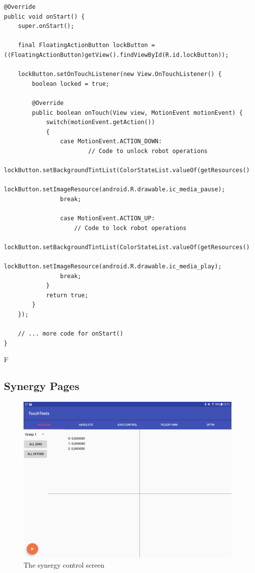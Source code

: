 \begin{lstlisting}[caption={Code for the interlock button}, label=lst:impl:interlock]
@Override
public void onStart() {
	super.onStart();
	
	final FloatingActionButton lockButton = ((FloatingActionButton)getView().findViewById(R.id.lockButton));

	lockButton.setOnTouchListener(new View.OnTouchListener() {
		boolean locked = true;
		
		@Override
		public boolean onTouch(View view, MotionEvent motionEvent) {
			switch(motionEvent.getAction())
			{
				case MotionEvent.ACTION_DOWN:
                        // Code to unlock robot operations
						lockButton.setBackgroundTintList(ColorStateList.valueOf(getResources().getColor(R.color.posOk)));
						lockButton.setImageResource(android.R.drawable.ic_media_pause);
				break;
				
				case MotionEvent.ACTION_UP:
					// Code to lock robot operations
					lockButton.setBackgroundTintList(ColorStateList.valueOf(getResources().getColor(R.color.posNOk)));
					lockButton.setImageResource(android.R.drawable.ic_media_play);
				break;
			}			
			return true;
		}
	});
	
	// ... more code for onStart()
}
\end{lstlisting}

F\subsection{Synergy Pages}

\begin{figure}
	\caption{The synergy control screen\label{fig:ui:syn}}
	\includegraphics[width=\linewidth]{assets/chpt_impl/syn_blank}
\end{figure}

